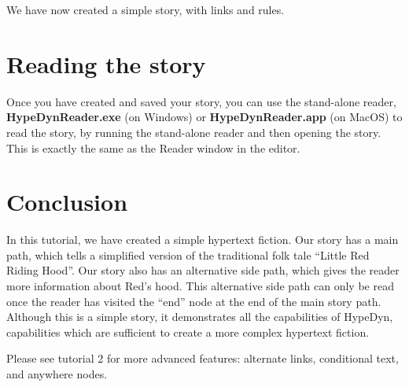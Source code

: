 \documentclass{article}
\begin{document}
We have now created a simple story, with links and rules.

\section{Reading the story}

Once you have created and saved your story, you can use the stand-alone reader,
\textbf{HypeDynReader.exe} (on Windows) or \textbf{HypeDynReader.app} (on
MacOS) to read the story, by running the stand-alone reader and then opening the
story. This is exactly the same as the Reader window in the editor.

\section{Conclusion}

In this tutorial, we have created a simple hypertext fiction. Our story has a
main path, which tells a simplified version of the traditional folk tale
``Little Red Riding Hood''. Our story also has an alternative side path, which
gives the reader more information about Red's hood. This alternative side path
can only be read once the reader has visited the ``end'' node at the end of the
main story path. Although this is a simple story, it demonstrates all the
capabilities of HypeDyn, capabilities which are sufficient to create a more
complex hypertext fiction.



Please see tutorial 2 for more advanced features: alternate links, conditional
text, and anywhere nodes.
\end{document}
